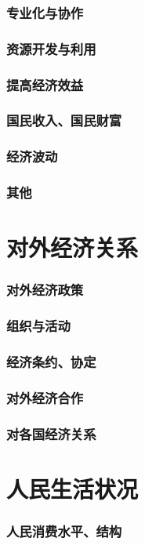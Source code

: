 \documentclass[UTF8]{../../RepresentationUniverse}
\begin{document}
    \subsubsection{专业化与协作}
    \subsubsection{资源开发与利用}
    \subsubsection{提高经济效益}
    \subsubsection{国民收入、国民财富}
    \subsubsection{经济波动}
    \subsubsection{其他}
\section{对外经济关系}
    \subsubsection{对外经济政策}
    \subsubsection{组织与活动}
    \subsubsection{经济条约、协定}
    \subsubsection{对外经济合作}
    \subsubsection{对各国经济关系}
\section{人民生活状况}
    \subsubsection{人民消费水平、结构}
\end{document}
